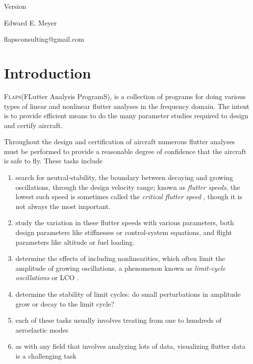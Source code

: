 \documentclass[11pt,openany,twoside]{book}
\numberwithin{equation}{section}		%
\newcommand{\Newterm}[1]{{\em #1}}
\newcommand{\Flaps}{\textsc{Flaps\:}}
\newcommand{\Lco}{LCO }
\begin{document}
\begin{center}
\vspace{1cm}
\large{Version }

\vspace{1cm}
\Large{Edward E. Meyer}
\par
\Large{\ttfamily flapsconsulting@gmail.com}
\end{center}

\author{Edward E. Meyer}

\tableofcontents
\listoftables
\listoffigures

\chapter{Introduction}\label{chap:intro}
\Flaps (FLutter Analysis ProgramS), is a collection of programs for doing various
types of linear and nonlinear flutter analyses in the frequency domain.
The intent is to provide efficient means to do the many parameter studies
required to design and certify aircraft.

Throughout the design and certification of aircraft numerous
flutter analyses must be performed to provide a reasonable degree
of confidence that the aircraft is safe to fly.
These tasks include
\begin{enumerate}\label{sect:tasks}
	\item search for neutral-stability,
			 the boundary between decaying and growing
			oscillations, through the design velocity range;
	      known as \Newterm{flutter speeds}, the lowest such speed
			is sometimes called the \Newterm{critical flutter speed}
			, though it is not always the most
			important.
	\item study the variation in these flutter speeds with various parameters,
	     both design parameters like stiffnesses or control-system
		  equations, and flight parameters like altitude or fuel loading.
	\item determine the effects of including nonlinearities,
			which often limit the amplitude of growing oscillations,
			a phenomenon known as \Newterm{limit-cycle oscillations} or \Lco.
	\item determine the stability of limit cycles:
	      do small perturbations in amplitude grow or decay to the limit cycle?
	\item each of these tasks usually involves treating from one to hundreds
			of aeroelastic modes
	\item as with any field that involves analyzing lots of data, visualizing
			flutter data is a challenging task
\end{enumerate}
\end{document}
